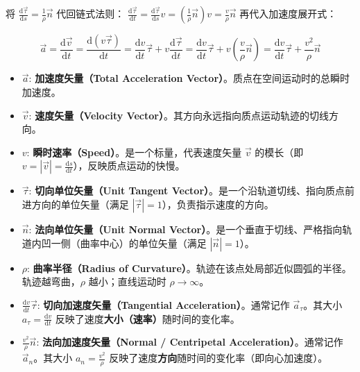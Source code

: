 将 $\frac{\mathrm{d}\vec{\tau}}{\mathrm{d}s} = \frac{1}{\rho}\vec{n}$ 代回链式法则： \(\frac{\mathrm{d}\vec{\tau}}{\mathrm{d}t} = \frac{\mathrm{d}\vec{\tau}}{\mathrm{d}s} v = \left(\frac{1}{\rho}\vec{n}\right) v = \frac{v}{\rho}\vec{n}\) 再代入加速度展开式：
\begin{definition}
$$\vec{a} = \frac{\mathrm{d}\vec{v}}{\mathrm{d}t} = \frac{\mathrm{d}(v\vec{\tau})}{\mathrm{d}t} = \frac{\mathrm{d}v}{\mathrm{d}t}\vec{\tau} + v\frac{\mathrm{d}\vec{\tau}}{\mathrm{d}t} = \frac{\mathrm{d}v}{\mathrm{d}t}\vec{\tau} + v\left(\frac{v}{\rho}\vec{n}\right)= \frac{\mathrm{d}v}{\mathrm{d}t}\vec{\tau} + \frac{v^2}{\rho}\vec{n}$$
\begin{itemize}
\item $\vec{a}$: \textbf{加速度矢量（Total Acceleration Vector）}。质点在空间运动时的总瞬时加速度。
\item $\vec{v}$: \textbf{速度矢量（Velocity Vector）}。其方向永远指向质点运动轨迹的切线方向。
\item $v$: \textbf{瞬时速率（Speed）}。是一个标量，代表速度矢量 $\vec{v}$ 的模长（即 $v = |\vec{v}| = \frac{\mathrm{d}s}{\mathrm{d}t}$），反映质点运动的快慢。
\item $\vec{\tau}$: \textbf{切向单位矢量（Unit Tangent Vector）}。是一个沿轨道切线、指向质点前进方向的单位矢量（满足 $|\vec{\tau}| = 1$），负责指示速度的方向。
\item $\vec{n}$: \textbf{法向单位矢量（Unit Normal Vector）}。是一个垂直于切线、严格指向轨道内凹一侧（曲率中心）的单位矢量（满足 $|\vec{n}| = 1$）。
\item $\rho$: \textbf{曲率半径（Radius of Curvature）}。轨迹在该点处局部近似圆弧的半径。轨迹越弯曲，$\rho$ 越小；直线运动时 $\rho \to \infty$。
\item $\frac{\mathrm{d}v}{\mathrm{d}t}\vec{\tau}$: \textbf{切向加速度矢量（Tangential Acceleration）}。通常记作 $\vec{a}_\tau$。其大小 $a_\tau = \frac{\mathrm{d}v}{\mathrm{d}t}$ 反映了速度\textbf{大小（速率）}随时间的变化率。
\item $\frac{v^2}{\rho}\vec{n}$: \textbf{法向加速度矢量（Normal / Centripetal Acceleration）}。通常记作 $\vec{a}_n$。其大小 $a_n = \frac{v^2}{\rho}$ 反映了速度\textbf{方向}随时间的变化率（即向心加速度）。
\end{itemize}
\end{definition}
